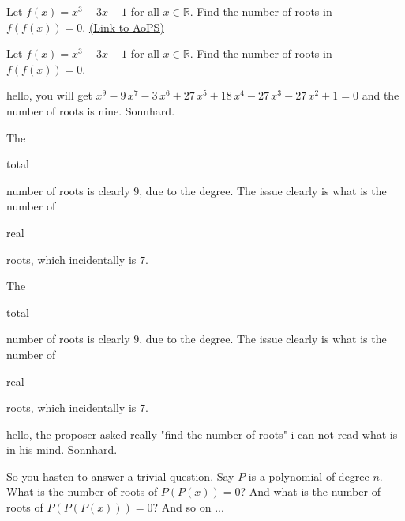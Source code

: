 \begin{problem}
	Let $f(x)=x^{3} -3x - 1$ for all $x \in \mathbb{R}$. Find the number of roots in  $f(f(x))=0$.
	\flushright \href{https://artofproblemsolving.com/community/c6h609835}{(Link to AoPS)}
\end{problem}



\begin{solution}
	\begin{tcolorbox}Let $f(x)=x^{3} -3x - 1$ for all $x \in \mathbb{R}$. Find the number of roots in  $f(f(x))=0$.\end{tcolorbox}
hello, you will get
${x}^{9}-9\,{x}^{7}-3\,{x}^{6}+27\,{x}^{5}+18\,{x}^{4}-27\,{x}^{3}-27\,
{x}^{2}+1
=0$ and the number of roots is nine.
Sonnhard.
\end{solution}



\begin{solution}
	The \begin{bolded}total\end{bolded} number of roots is clearly $9$, due to the degree. The issue clearly is what is the number of \begin{bolded}real\end{bolded} roots, which incidentally is $7$.
\end{solution}



\begin{solution}
	\begin{tcolorbox}The \begin{bolded}total\end{bolded} number of roots is clearly $9$, due to the degree. The issue clearly is what is the number of \begin{bolded}real\end{bolded} roots, which incidentally is $7$.\end{tcolorbox}
hello, the proposer asked really "find the number of roots" i can not read what is in his mind.
Sonnhard.
\end{solution}



\begin{solution}
	So you hasten to answer a trivial question. Say $P$ is a polynomial of degree $n$. What is the number of roots of $P(P(x)) = 0$? And what is the number of roots of $P(P(P(x))) = 0$? And so on ...
\end{solution}



